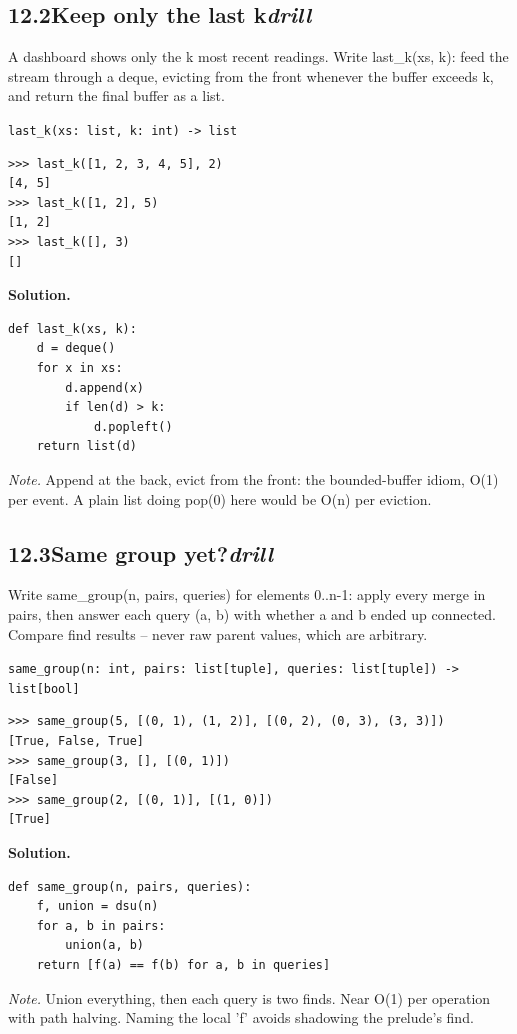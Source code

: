 \documentclass[10pt,letterpaper]{book}
\begin{document}
\subsection*{12.2\quad Keep only the last k\hfill\textnormal{\textit{drill}}}
A dashboard shows only the k most recent readings. Write last\_k(xs, k): feed the stream through a deque, evicting from the front whenever the buffer exceeds k, and return the final buffer as a list.

\noindent\texttt{last\_k(xs: list, k: int) -> list}
\begin{lstlisting}[style=ex]
>>> last_k([1, 2, 3, 4, 5], 2)
[4, 5]
>>> last_k([1, 2], 5)
[1, 2]
>>> last_k([], 3)
[]
\end{lstlisting}
\noindent\textbf{Solution.}
\begin{lstlisting}[style=code]
def last_k(xs, k):
    d = deque()
    for x in xs:
        d.append(x)
        if len(d) > k:
            d.popleft()
    return list(d)
\end{lstlisting}
\noindent\textit{Note.} Append at the back, evict from the front: the bounded-buffer idiom, O(1) per event. A plain list doing pop(0) here would be O(n) per eviction.

\subsection*{12.3\quad Same group yet?\hfill\textnormal{\textit{drill}}}
Write same\_group(n, pairs, queries) for elements 0..n-1: apply every merge in pairs, then answer each query (a, b) with whether a and b ended up connected. Compare find results -- never raw parent values, which are arbitrary.

\noindent\texttt{same\_group(n: int, pairs: list[tuple], queries: list[tuple]) -> list[bool]}
\begin{lstlisting}[style=ex]
>>> same_group(5, [(0, 1), (1, 2)], [(0, 2), (0, 3), (3, 3)])
[True, False, True]
>>> same_group(3, [], [(0, 1)])
[False]
>>> same_group(2, [(0, 1)], [(1, 0)])
[True]
\end{lstlisting}
\noindent\textbf{Solution.}
\begin{lstlisting}[style=code]
def same_group(n, pairs, queries):
    f, union = dsu(n)
    for a, b in pairs:
        union(a, b)
    return [f(a) == f(b) for a, b in queries]
\end{lstlisting}
\noindent\textit{Note.} Union everything, then each query is two finds. Near O(1) per operation with path halving. Naming the local 'f' avoids shadowing the prelude's find.
\end{document}
